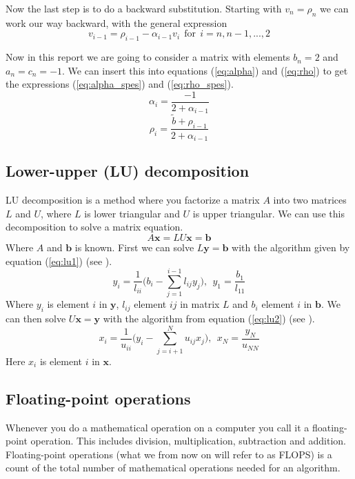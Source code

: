 \documentclass[reprint, english,notitlepage]{revtex4-1}  %
\begin{document}
Now the last step is to do a backward substitution. Starting with $v_n = \rho_n$ we can work our way backward, with the general expression
\begin{equation}
	v_{i-1} = \rho_{i-1} - \alpha_{i-1}v_i \ \ \text{for} \ \ i = n, n-1, ..., 2
	\label{eq:v}
\end{equation}

Now in this report we are going to consider a matrix with elements $b_n = 2$ and $a_n = c_n = -1$. We can insert this into equations (\ref{eq:alpha}) and (\ref{eq:rho}) to get the expressions (\ref{eq:alpha_spes}) and (\ref{eq:rho_spes}).
\begin{equation}
\alpha_i = \frac{-1}{2 + \alpha_{i-1}}
\label{eq:alpha_spes}
\end{equation}
\begin{equation}
	\rho_i = \frac{\tilde{b} + \rho_{i-1}}{2 + \alpha_{i-1}}
	\label{eq:rho_spes}
\end{equation}

\subsection{Lower-upper (LU) decomposition}
LU decomposition is a method where you factorize a matrix $A$ into two matrices $L$ and $U$, where $L$ is lower triangular and $U$ is upper triangular. We can use this decomposition to solve a matrix equation.
\begin{equation*}
	A\mathbf{x} = LU\mathbf{x} = \mathbf{b}
\end{equation*}
Where $A$ and $\mathbf{b}$ is known. First we can solve $L\mathbf{y}=\mathbf{b}$ with the algorithm given by equation (\ref{eq:lu1}) (see \citep{lu}).
\begin{equation}
	y_i = \frac{1}{l_{ii}}\bigg(b_i - \sum_{j=1}^{i-1}l_{ij}y_j\bigg),\ \ y_1 = \frac{b_1}{l_{11}}
	\label{eq:lu1}
\end{equation}
Where $y_i$ is element $i$ in $\mathbf{y}$, $l_{ij}$ element $ij$ in matrix $L$ and $b_i$ element $i$ in $\mathbf{b}$. We can then solve $U\mathbf{x} = \mathbf{y}$ with the algorithm from equation (\ref{eq:lu2}) (see \citep{lu}).
\begin{equation}
	x_i = \frac{1}{u_{ii}}\bigg(y_i - \sum_{j=i+1}^{N}u_{ij}x_j\bigg),\ \ x_N=\frac{y_N}{u_{NN}}
	\label{eq:lu2}
\end{equation}
Here $x_i$ is element $i$ in $\mathbf{x}$.

\subsection{Floating-point operations}
Whenever you do a mathematical operation on a computer you call it a floating-point operation. This includes division, multiplication, subtraction and addition. Floating-point operations (what we from now on will refer to as FLOPS) is a count of the total number of mathematical operations needed for an algorithm.
\end{document}
